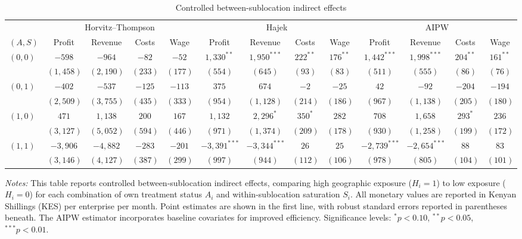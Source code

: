 \documentclass{article}
\begin{document}
\begin{table}[H]
\centering
\caption{Controlled between-sublocation indirect effects}
\label{tab:between_indirect}
\footnotesize
\begin{tabular}{lcccccccccccc}
\toprule
& \multicolumn{4}{c}{Horvitz--Thompson} & \multicolumn{4}{c}{Hajek} & \multicolumn{4}{c}{AIPW} \\
\cmidrule(lr){2-5} \cmidrule(lr){6-9} \cmidrule(lr){10-13}
$(A,S)$ & Profit & Revenue & Costs & Wage & Profit & Revenue & Costs & Wage & Profit & Revenue & Costs & Wage \\
\midrule
$(0,0)$ & $-598$ & $-964$ & $-82$ & $-52$ & $1{,}330^{**}$ & $1{,}950^{***}$ & $222^{**}$ & $176^{**}$ & $1{,}442^{***}$ & $1{,}998^{***}$ & $204^{**}$ & $161^{**}$ \\
        & $(1{,}458)$ & $(2{,}190)$ & $(233)$ & $(177)$ & $(554)$ & $(645)$ & $(93)$ & $(83)$ & $(511)$ & $(555)$ & $(86)$ & $(76)$ \\
\addlinespace
$(0,1)$ & $-402$ & $-537$ & $-125$ & $-113$ & $375$ & $674$ & $-2$ & $-25$ & $42$ & $-92$ & $-204$ & $-194$ \\
        & $(2{,}509)$ & $(3{,}755)$ & $(435)$ & $(333)$ & $(954)$ & $(1{,}128)$ & $(214)$ & $(186)$ & $(967)$ & $(1{,}138)$ & $(205)$ & $(180)$ \\
\addlinespace
$(1,0)$ & $471$ & $1{,}138$ & $200$ & $167$ & $1{,}132$ & $2{,}296^{*}$ & $350^{*}$ & $282$ & $708$ & $1{,}658$ & $293^{*}$ & $236$ \\
        & $(3{,}127)$ & $(5{,}052)$ & $(594)$ & $(446)$ & $(971)$ & $(1{,}374)$ & $(209)$ & $(178)$ & $(930)$ & $(1{,}258)$ & $(199)$ & $(172)$ \\
\addlinespace
$(1,1)$ & $-3{,}906$ & $-4{,}882$ & $-283$ & $-201$ & $-3{,}391^{***}$ & $-3{,}344^{***}$ & $26$ & $25$ & $-2{,}739^{***}$ & $-2{,}654^{***}$ & $88$ & $83$ \\
        & $(3{,}146)$ & $(4{,}127)$ & $(387)$ & $(299)$ & $(997)$ & $(944)$ & $(112)$ & $(106)$ & $(978)$ & $(805)$ & $(104)$ & $(101)$ \\
\bottomrule
\end{tabular}
\begin{minipage}{0.95\textwidth}
\vspace{2mm}
\footnotesize
\textit{Notes:} This table reports controlled between-sublocation indirect effects, comparing high geographic exposure ($H_i=1$) to low exposure ($H_i=0$) for each combination of own treatment status $A_i$ and within-sublocation saturation $S_i$. All monetary values are reported in Kenyan Shillings (KES) per enterprise per month. Point estimates are shown in the first line, with robust standard errors reported in parentheses beneath. The AIPW estimator incorporates baseline covariates for improved efficiency. Significance levels: $^{*}p<0.10$, $^{**}p<0.05$, $^{***}p<0.01$.
\end{minipage}
\end{table}
\end{document}
